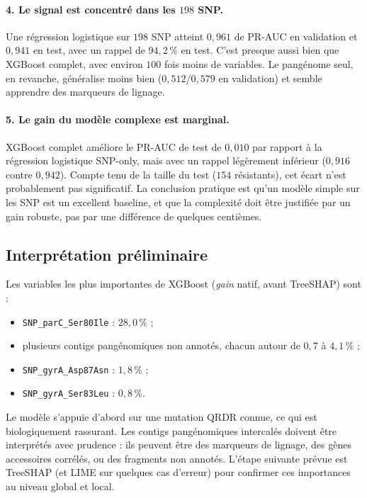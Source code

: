 \documentclass[11pt,a4paper]{article}
\begin{document}
\paragraph{4. Le signal est concentré dans les $198$ SNP.}
Une régression logistique sur $198$ SNP atteint $0{,}961$ de PR-AUC en validation et $0{,}941$ en test, avec un rappel de $94{,}2\,\%$ en test. C'est presque aussi bien que XGBoost complet, avec environ $100$ fois moins de variables. Le pangénome seul, en revanche, généralise moins bien ($0{,}512$/$0{,}579$ en validation) et semble apprendre des marqueurs de lignage.

\paragraph{5. Le gain du modèle complexe est marginal.}
XGBoost complet améliore le PR-AUC de test de $0{,}010$ par rapport à la régression logistique SNP-only, mais avec un rappel légèrement inférieur ($0{,}916$ contre $0{,}942$). Compte tenu de la taille du test ($154$ résistants), cet écart n'est probablement pas significatif. La conclusion pratique est qu'un modèle simple sur les SNP est un excellent baseline, et que la complexité doit être justifiée par un gain robuste, pas par une différence de quelques centièmes.

\subsection{Interprétation préliminaire}

Les variables les plus importantes de XGBoost (\emph{gain} natif, avant TreeSHAP) sont :
\begin{itemize}[leftmargin=1.2em]
    \item \texttt{SNP\_parC\_Ser80Ile} : $28{,}0\,\%$ ;
    \item plusieurs contigs pangénomiques non annotés, chacun autour de $0{,}7$ à $4{,}1\,\%$ ;
    \item \texttt{SNP\_gyrA\_Asp87Asn} : $1{,}8\,\%$ ;
    \item \texttt{SNP\_gyrA\_Ser83Leu} : $0{,}8\,\%$.
\end{itemize}

Le modèle s'appuie d'abord sur une mutation QRDR connue, ce qui est biologiquement rassurant. Les contigs pangénomiques intercalés doivent être interprétés avec prudence : ils peuvent être des marqueurs de lignage, des gènes accessoires corrélés, ou des fragments non annotés. L'étape suivante prévue est TreeSHAP (et LIME sur quelques cas d'erreur) pour confirmer ces importances au niveau global et local.
\end{document}
